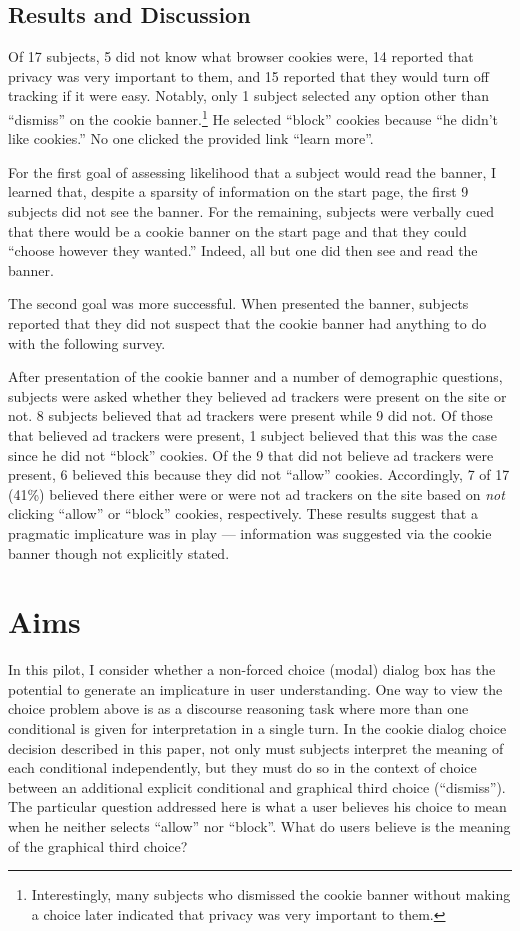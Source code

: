 \subsection{Results and Discussion}
\label{resultsanddiscussion}

Of 17 subjects, 5 did not know what browser cookies were, 14 reported that privacy was very important to them, and 15 reported that they would turn off tracking if it were easy. Notably, only 1 subject selected any option other than ``dismiss'' on the cookie banner.\footnote{Interestingly, many subjects who dismissed the cookie banner without making a choice later indicated that privacy was very important to them.} He selected ``block'' cookies because ``he didn't like cookies.'' No one clicked the provided link ``learn more''.

For the first goal of assessing likelihood that a subject would read the banner, I learned that, despite a sparsity of information on the start page, the first 9 subjects did not see the banner. For the remaining, subjects were verbally cued that there would be a cookie banner on the start page and that they could ``choose however they wanted.'' Indeed, all but one did then see and read the banner. 

The second goal was more successful. When presented the banner, subjects reported that they did not suspect that the cookie banner had anything to do with the following survey.

After presentation of the cookie banner and a number of demographic questions, subjects were asked whether they believed ad trackers were present on the site or not. 8 subjects believed that ad trackers were present while 9 did not. Of those that believed ad trackers were present, 1 subject believed that this was the case since he did not ``block'' cookies. Of the 9 that did not believe ad trackers were present, 6 believed this because they did not ``allow'' cookies. Accordingly, 7 of 17 (41\%) believed there either were or were not ad trackers on the site based on \emph{not} clicking ``allow'' or ``block'' cookies, respectively. These results suggest that a pragmatic implicature was in play --- information was suggested via the cookie banner though not explicitly stated. 

\section{Aims}
\label{aims}

In this pilot, I consider whether a non-forced choice (modal) dialog box has the potential to generate an implicature in user understanding. One way to view the choice problem above is as a discourse reasoning task where more than one conditional is given for interpretation in a single turn. In the cookie dialog choice decision described in this paper, not only must subjects interpret the meaning of each conditional independently, but they must do so in the context of choice between an additional explicit conditional and graphical third choice (``dismiss''). The particular question addressed here is what a user believes his choice to mean when he neither selects ``allow'' nor ``block''. What do users believe is the meaning of the graphical third choice? 

